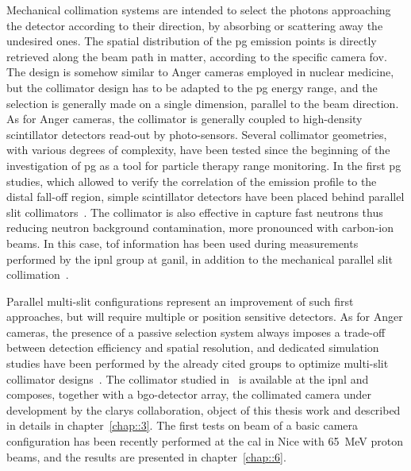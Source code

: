 Mechanical collimation systems are intended to select the photons approaching the detector according to their direction, by absorbing or scattering away the undesired ones. The spatial distribution of the \gls{pg} emission points is directly retrieved along the beam path in matter, according to the specific camera \gls{fov}. The design is somehow similar to Anger cameras employed in nuclear medicine, but the collimator design has to be adapted to the \gls{pg} energy range, and the selection is generally made on a single dimension, parallel to the beam direction. As for Anger cameras, the collimator is generally coupled to high-density scintillator detectors read-out by photo-sensors.  
Several collimator geometries, with various degrees of complexity, have been tested since the beginning of the investigation of \gls{pg} as a tool for particle therapy range monitoring.
In the first \gls{pg} studies, which allowed to verify the correlation of the emission profile to the distal fall-off region, simple scintillator detectors have been placed behind parallel slit collimators~\parencite{Min2006, Min2007}. The collimator is also effective in capture fast neutrons thus reducing neutron background contamination, more pronounced with carbon-ion beams. In this case, \gls{tof} information has been used during measurements performed by the \gls{ipnl} group at \gls{ganil}, in addition to the mechanical parallel slit collimation~\parencite{Testa2008, Testa2009}. 

Parallel multi-slit configurations  represent an improvement of such first approaches, but will require multiple or position sensitive detectors. As for Anger cameras, the presence of a passive selection system always imposes a trade-off between detection efficiency and spatial resolution, and dedicated simulation studies have been performed by the already cited groups to optimize multi-slit collimator designs~\parencite{Min2012, Pinto2014}. The collimator studied in~\cite{Pinto2014} is available at the \gls{ipnl} and composes, together with a \gls{bgo}-detector array, the collimated camera under development by the \gls{clarys} collaboration, object of this thesis work and described in details in chapter~\ref{chap::3}. The first tests on beam of a basic camera configuration has been recently performed at the \gls{cal} in Nice with 65~MeV proton beams, and the results are presented in chapter~\ref{chap::6}.   

